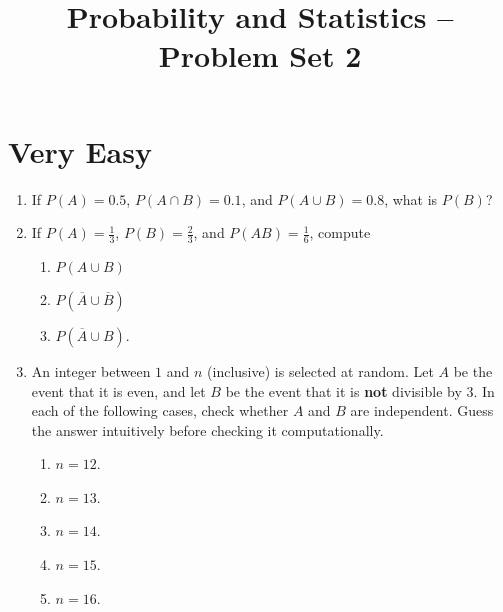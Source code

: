 \documentclass[svgnames]{amsart}
\title[]{Probability and Statistics -- Problem Set 2}
\begin{document}
\maketitle


\section{Very Easy}
\begin{enumerate}[leftmargin=*]
\item If $P(A) = 0.5$, $P(A \cap B) = 0.1$, and $P(A \cup B) = 0.8$, what is $P(B)$?

\item If $P(A) = \frac 1 3$, $P(B) = \frac 2 3$, and $P(AB) = \frac 1 6$, compute
\begin{enumerate}
	\item $P(A \cup B)$
	\item $P(\overline A \cup \overline B)$
	\item $P(\overline A \cup B)$.
\end{enumerate}

\item An integer between $1$ and $n$ (inclusive) is selected at random. Let $A$ be the event that it is even, and let $B$ be the event that it is \textbf{not} divisible by $3$. In each of the following cases, check whether $A$ and $B$ are independent. Guess the answer intuitively before checking it computationally.
\begin{enumerate}
	\item $n = 12$.
	\item $n = 13$.
	\item $n = 14$.
	\item $n = 15$.
	\item $n = 16$.
\end{enumerate}
\end{enumerate} %
\end{document}
